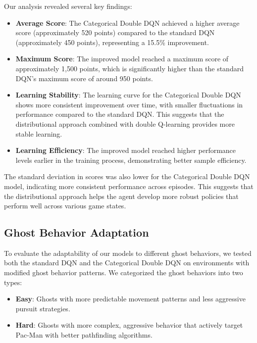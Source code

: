 \documentclass{article} %
\begin{document}
Our analysis revealed several key findings:

\begin{itemize}
  \item \textbf{Average Score}: The Categorical Double DQN achieved a higher average score (approximately 520 points) compared to the standard DQN (approximately 450 points), representing a 15.5\% improvement.

  \item \textbf{Maximum Score}: The improved model reached a maximum score of approximately 1,500 points, which is significantly higher than the standard DQN's maximum score of around 950 points.

  \item \textbf{Learning Stability}: The learning curve for the Categorical Double DQN shows more consistent improvement over time, with smaller fluctuations in performance compared to the standard DQN. This suggests that the distributional approach combined with double Q-learning provides more stable learning.

  \item \textbf{Learning Efficiency}: The improved model reached higher performance levels earlier in the training process, demonstrating better sample efficiency.
\end{itemize}

The standard deviation in scores was also lower for the Categorical Double DQN model, indicating more consistent performance across episodes. This suggests that the distributional approach helps the agent develop more robust policies that perform well across various game states.

\subsection{Ghost Behavior Adaptation}

To evaluate the adaptability of our models to different ghost behaviors, we tested both the standard DQN and the Categorical Double DQN on environments with modified ghost behavior patterns. We categorized the ghost behaviors into two types:

\begin{itemize}
  \item \textbf{Easy}: Ghosts with more predictable movement patterns and less aggressive pursuit strategies.
  \item \textbf{Hard}: Ghosts with more complex, aggressive behavior that actively target Pac-Man with better pathfinding algorithms.
\end{itemize}
\end{document}
